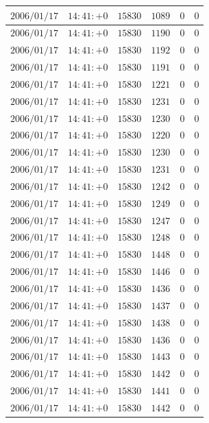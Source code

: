 \documentclass[a4j,papersize,disablejfam,slide,14pt]{jsarticle}
\begin{document}
\begin{description}
\begin{center}
\begin{longtable}{|l|l|l|l|l|l|}
					$2006/01/17$ & $14:41:+0$  & $15830$ & $1089$ & $0$ & $0$ \\ \hline
					$2006/01/17$ & $14:41:+0$  & $15830$ & $1190$ & $0$ & $0$ \\ \hline
					$2006/01/17$ & $14:41:+0$  & $15830$ & $1192$ & $0$ & $0$ \\ \hline
					$2006/01/17$ & $14:41:+0$  & $15830$ & $1191$ & $0$ & $0$ \\ \hline
					$2006/01/17$ & $14:41:+0$  & $15830$ & $1221$ & $0$ & $0$ \\ \hline
					$2006/01/17$ & $14:41:+0$  & $15830$ & $1231$ & $0$ & $0$ \\ \hline
					$2006/01/17$ & $14:41:+0$  & $15830$ & $1230$ & $0$ & $0$ \\ \hline
					$2006/01/17$ & $14:41:+0$  & $15830$ & $1220$ & $0$ & $0$ \\ \hline
					$2006/01/17$ & $14:41:+0$  & $15830$ & $1230$ & $0$ & $0$ \\ \hline
					$2006/01/17$ & $14:41:+0$  & $15830$ & $1231$ & $0$ & $0$ \\ \hline
					$2006/01/17$ & $14:41:+0$  & $15830$ & $1242$ & $0$ & $0$ \\ \hline
					$2006/01/17$ & $14:41:+0$  & $15830$ & $1249$ & $0$ & $0$ \\ \hline
					$2006/01/17$ & $14:41:+0$  & $15830$ & $1247$ & $0$ & $0$ \\ \hline
					$2006/01/17$ & $14:41:+0$  & $15830$ & $1248$ & $0$ & $0$ \\ \hline
					$2006/01/17$ & $14:41:+0$  & $15830$ & $1448$ & $0$ & $0$ \\ \hline
					$2006/01/17$ & $14:41:+0$  & $15830$ & $1446$ & $0$ & $0$ \\ \hline
					$2006/01/17$ & $14:41:+0$  & $15830$ & $1436$ & $0$ & $0$ \\ \hline
					$2006/01/17$ & $14:41:+0$  & $15830$ & $1437$ & $0$ & $0$ \\ \hline
					$2006/01/17$ & $14:41:+0$  & $15830$ & $1438$ & $0$ & $0$ \\ \hline
					$2006/01/17$ & $14:41:+0$  & $15830$ & $1436$ & $0$ & $0$ \\ \hline
					$2006/01/17$ & $14:41:+0$  & $15830$ & $1443$ & $0$ & $0$ \\ \hline
					$2006/01/17$ & $14:41:+0$  & $15830$ & $1442$ & $0$ & $0$ \\ \hline
					$2006/01/17$ & $14:41:+0$  & $15830$ & $1441$ & $0$ & $0$ \\ \hline
					$2006/01/17$ & $14:41:+0$  & $15830$ & $1442$ & $0$ & $0$ \\ \hline

\end{longtable}
\end{center}
\end{description}
\end{document}
